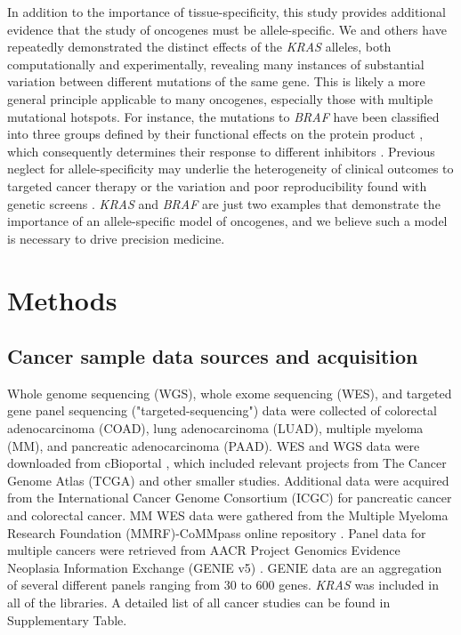 \documentclass[english, 10pt, letterpaper]{article}
\newcommand{\KRAS}{\emph{KRAS}}
\begin{document}
In addition to the importance of tissue-specificity, this study provides additional evidence that the study of oncogenes must be allele-specific.
We and others have repeatedly demonstrated the distinct effects of the \KRAS{} alleles, both computationally and experimentally, revealing many instances of substantial variation between different mutations of the same gene.
This is likely a more general principle applicable to many oncogenes, especially those with multiple mutational hotspots.
For instance, the mutations to \emph{BRAF} have been classified into three groups defined by their functional effects on the protein product \cite{Yao2015BRAFInhibition., Yao2017TumoursRAS.}, which consequently determines their response to different inhibitors \cite{Dagogo-Jack2019, Bracht2019BRAFRationale.}.
Previous neglect for allele-specificity may underlie the heterogeneity of clinical outcomes to targeted cancer therapy or the variation and poor reproducibility found with genetic screens \cite{Evers2014TheQuality.}.
\KRAS{} and \emph{BRAF} are just two examples that demonstrate the importance of an allele-specific model of oncogenes, and we believe such a model is necessary to drive precision medicine.




\section*{Methods}

\subsection*{Cancer sample data sources and acquisition}

Whole genome sequencing (WGS), whole exome sequencing (WES), and targeted gene panel sequencing ("targeted-sequencing") data were collected of colorectal adenocarcinoma (COAD), lung adenocarcinoma (LUAD), multiple myeloma (MM), and pancreatic adenocarcinoma (PAAD).
WES and WGS data were downloaded from cBioportal \cite{Gao2013, Cerami2012}, which included relevant projects from The Cancer Genome Atlas (TCGA) \cite{CancerGenomeAtlasNetwork2012, CancerGenomeAtlasResearchNetwork2014, CancerGenomeAtlasResearchNetwork.Electronicaddress:andrew_aguirredfci.harvard.edu2017} and other smaller studies. 
Additional data were acquired from the International Cancer Genome Consortium (ICGC) for pancreatic cancer \cite{Scarlett2011} and colorectal cancer. 
MM WES data were gathered from the Multiple Myeloma Research Foundation (MMRF)-CoMMpass online repository \cite{Walker2019AAnalysis.}.
Panel data for multiple cancers were retrieved from AACR Project Genomics Evidence Neoplasia Information Exchange (GENIE v5) \cite{AACRProjectGENIEConsortium2017AACRConsortium.}.
GENIE data are an aggregation of several different panels ranging from 30 to 600 genes.
\KRAS{} was included in all of the libraries. 
A detailed list of all cancer studies can be found in Supplementary Table.
\end{document}
